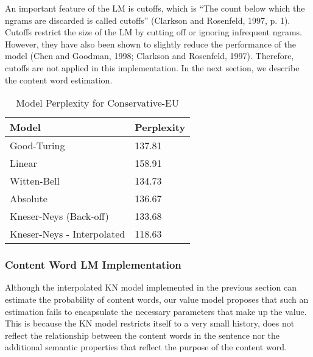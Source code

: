 An important feature of the LM is cutoffs, which is ``The count below which the ngrams are discarded is called cutoffs'' (Clarkson and Rosenfeld, 1997, p. 1). Cutoffs restrict the size of the LM by cutting off or ignoring infrequent ngrams.  However, they have also been shown to slightly reduce the performance of the model (Chen and Goodman, 1998; Clarkson and Rosenfeld, 1997). Therefore, cutoffs are not applied in this implementation. In the next section, we describe the content word estimation.


\begin{table}%
\caption{Model Perplexity for Conservative-EU}
\label{tab:nine}
\begin{minipage}{\columnwidth}
\begin{center}
\begin{tabular}{ll} 
\toprule
Model & Perplexity \\
  \toprule
  

Good-Turing	& 137.81 \\
Linear	& 158.91 \\
Witten-Bell	& 134.73 \\
Absolute	& 136.67 \\
Kneser-Neys (Back-off)	& 133.68 \\
Kneser-Neys - Interpolated	& 118.63 \\
\bottomrule
\end{tabular}
\end{center}
\bigskip\centering

\end{minipage}
\end{table}%


\subsubsection{Content Word LM Implementation}
Although the interpolated KN model implemented in the previous section can estimate the probability of content words, our value model proposes that such an estimation fails to encapsulate the necessary parameters that make up the value. This is because the KN model restricts itself to a very small history, does not reflect the relationship between the content words in the sentence nor the additional semantic properties that reflect the purpose of the content word. 


